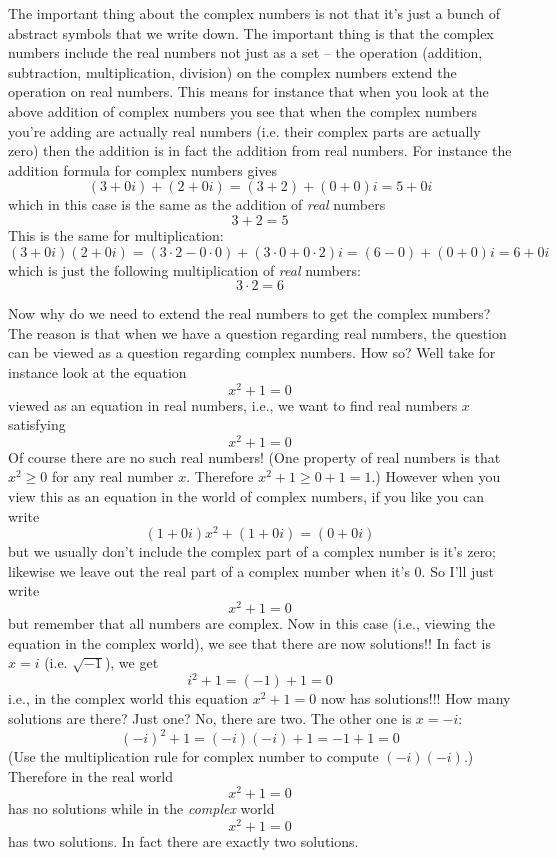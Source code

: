 The important thing about the complex numbers is not that it's just a bunch of abstract symbols that we write down.
The important thing is that the complex numbers include the real numbers not just as a set -- 
the operation (addition, subtraction, multiplication, division) on the complex numbers extend the operation on real numbers.
This means for instance that when you look at the above addition of complex numbers you see that
when the complex numbers you're adding are actually real numbers (i.e. their complex parts are actually zero)
then the addition is in fact the addition from real numbers.
For instance the addition formula for complex numbers gives
\[
(3 + 0i) + (2 + 0i) = (3 + 2) + (0 + 0)i = 5 + 0i
\]
which in this case is the same as the addition of \textit{real} numbers
\[
3 + 2 = 5
\]
This is the same for multiplication:
\[
(3 + 0i)(2 + 0i) = (3 \cdot 2 - 0 \cdot 0) + (3 \cdot 0 + 0 \cdot 2) i = (6 - 0) + (0 + 0)i = 6 + 0i
\]
which is just the following multiplication of \textit{real} numbers:
\[
3 \cdot 2 = 6
\]

Now why do we need to extend the real numbers to get the complex numbers?
The reason is that when we have a question regarding real numbers, the question can be viewed as a question regarding
complex numbers.
How so?
Well take for instance look at the equation
\[
x^2 + 1 = 0
\]
viewed as an equation in real numbers, i.e., we want to find real numbers $x$ satisfying
\[
x^2 + 1 = 0
\]
Of course there are no such real numbers!
(One property of real numbers is that $x^2 \geq 0$ for any real number $x$.
Therefore $x^2 + 1 \geq 0 + 1 = 1$.)
However when you view this as an equation in the world of complex numbers, if you like you can write
\[
(1 + 0i)x^2 + (1+0i) = (0 + 0i)
\]
but we usually don't include the complex part of a complex number is it's zero; likewise we leave out the
real part of a complex number when it's 0.
So I'll just write
\[
x^2 + 1 = 0
\]
but remember that all numbers are complex.
Now in this case (i.e., viewing the equation in the complex world), we see that there are now
solutions!!
In fact is $x = i$ (i.e. $\sqrt{-1}$), we get
\[
i^2 + 1 = (-1) + 1 = 0
\]
i.e., in the complex world this equation $x^2 + 1 = 0$ now has solutions!!!
How many solutions are there? Just one?
No, there are two.
The other one is $x = -i$:
\[
(-i)^2 + 1 = (-i)(-i) + 1 = -1 + 1 = 0
\]
(Use the multiplication rule for complex number to compute $(-i)(-i)$.)
Therefore in the real world
\[
x^2 + 1 = 0
\]
has no solutions while in the \textit{complex} world
\[
x^2 + 1 = 0
\]
has two solutions.
In fact there are exactly two solutions.

